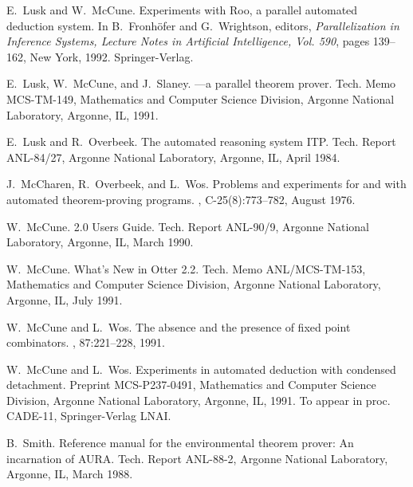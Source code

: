 
% 
\begin{thebibliography}{1}

E.~Lusk and W.~McCune.
\newblock Experiments with {{\sc Roo}}, a parallel automated deduction system.
\newblock In B.~{Fronh\"ofer} and G.~Wrightson, editors, {\em Parallelization
  in Inference Systems, Lecture Notes in Artificial Intelligence, Vol. 590},
  pages 139--162, New York, 1992. Springer-Verlag.

E.~Lusk, W.~McCune, and J.~Slaney.
---a parallel theorem prover.
\newblock Tech. Memo MCS-TM-149, Mathematics and Computer Science Division,
  Argonne National Laboratory, Argonne, IL, 1991.

E.~Lusk and R.~Overbeek.
\newblock The automated reasoning system {ITP}.
\newblock Tech. Report ANL-84/27, Argonne National Laboratory, Argonne, IL,
  April 1984.

J.~McCharen, R.~Overbeek, and L.~Wos.
\newblock Problems and experiments for and with automated theorem-proving
  programs.
, C-25(8):773--782, August 1976.

W.~McCune.
 2.0 {U}sers {G}uide.
\newblock Tech. Report ANL-90/9, Argonne National Laboratory, Argonne, IL,
  March 1990.

W.~McCune.
\newblock What's {N}ew in {{\sc Otter}} 2.2.
\newblock Tech. Memo ANL/MCS-TM-153, Mathematics and Computer Science Division,
  Argonne National Laboratory, Argonne, IL, July 1991.

W.~McCune and L.~Wos.
\newblock The absence and the presence of fixed point combinators.
, 87:221--228, 1991.

W.~McCune and L.~Wos.
\newblock Experiments in automated deduction with condensed detachment.
\newblock Preprint MCS-P237-0491, Mathematics and Computer Science Division,
  Argonne National Laboratory, Argonne, IL, 1991.
\newblock To appear in proc. CADE-11, Springer-Verlag LNAI.

B.~Smith.
\newblock Reference manual for the environmental theorem prover: An incarnation
  of {AURA}.
\newblock Tech. Report ANL-88-2, Argonne National Laboratory, Argonne, IL,
  March 1988.

\end{thebibliography}



